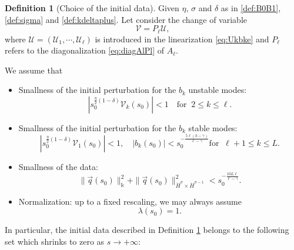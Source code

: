 \documentclass[11pt]{aims}
\theoremstyle{definition}
\newtheorem{definition}[theorem]{Definition}
\numberwithin{equation}{section}
\begin{document}
\begin{definition}[Choice of the initial data] \label{def:1}  Given $\eta$, $\sigma$ and $\delta$ as in \eqref{def:B0B1}, \eqref{def:sigma} and \eqref{def:kdeltaplus}. Let consider the change of variable 
\begin{equation}\label{def:VctoUc}
{\mathcal{V}} = P_\ell {\mathcal{U}},
\end{equation}
where ${\mathcal{U}} = ({\mathcal{U}}_1, \cdots, {\mathcal{U}}_\ell)$ is introduced in the linearization \eqref{eq:Ukbke} and $P_\ell$ refers to the diagonalization \eqref{eq:diagAlPl} of $A_\ell$.

We assume that 
\begin{itemize}
\item Smallness of the initial perturbation for the $b_k$ unstable modes: 
\begin{equation}
|s_0^{\frac{\eta}{2}(1 - \delta)}{\mathcal{V}}_k(s_0)| < 1 \quad \text{for}\;\; 2 \leq k \leq \ell.
\end{equation}
\item Smallness of the initial perturbation for the $b_k$ stable modes: 
\begin{equation}\label{eq:initbk}
|s_0^{\frac{\eta}{2}(1 - \delta)}{\mathcal{V}}_1(s_0)| < 1, \quad |b_k(s_0)| <s_0^{-\frac{5\ell(k - \gamma)}{\ell - \gamma}} \text{for}\;\; \ell+1 \leq k \leq L.
\end{equation}
\item Smallness of the data:
\begin{equation}\label{eq:intialbounE2m}
\|\vec q(s_0)\|^2_{\Bbbk} + \|\vec q(s_0)\|^2_{\dot{H}^\sigma \times \dot{H}^{\sigma - 1}}  < s_0^{-\frac{10L\ell}{\ell - \gamma}}.
\end{equation}

\item Normalization: up to a fixed rescaling, we may always assume
\begin{equation}
\lambda(s_0) = 1.
\end{equation}
\end{itemize}
\end{definition}

In particular, the initial data described in Definition \ref{def:1} belongs to the following set which shrinks to zero as $s \to +\infty$:
\end{document}
